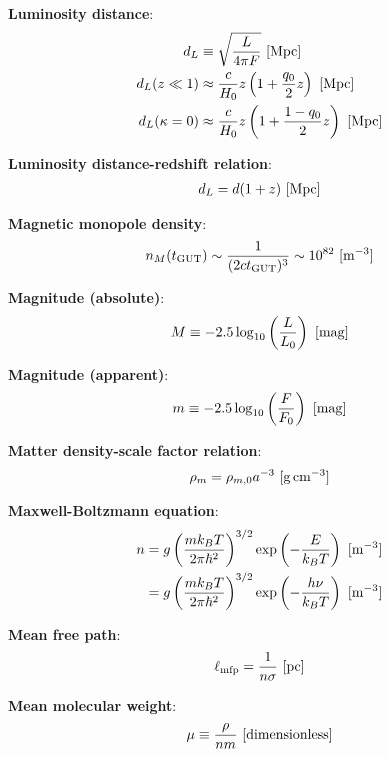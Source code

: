 \documentclass[a4paper,11pt]{article}
\begin{document}
{\noindent}\textbf{Luminosity distance}:
\begin{align*}
    d_L &\equiv \sqrt{\frac{L}{4\pi F}} ~ [{\rm Mpc}] \\
    d_L(z\ll1) &\approx \frac{c}{H_0}z\left(1+\frac{q_0}{2}z\right) ~ [{\rm Mpc}] \\
    d_L(\kappa=0) &\approx \frac{c}{H_0}z \left(1+\frac{1-q_0}{2}z\right) ~ [{\rm Mpc}]
\end{align*}

{\noindent}\textbf{Luminosity distance-redshift relation}:
\begin{align*}
    d_L = d(1+z) ~ [{\rm Mpc}]
\end{align*}

{\noindent}\textbf{Magnetic monopole density}:
\begin{align*}
    n_M(t_\mathrm{GUT}) \sim \frac{1}{(2ct_\mathrm{GUT})^3} \sim 10^{82} ~ [{\rm m^{-3}}]
\end{align*}

{\noindent}\textbf{Magnitude (absolute)}:
\begin{align*}
    M \equiv -2.5\log_{10}\left(\frac{L}{L_0}\right) ~ [{\rm mag}]
\end{align*}

{\noindent}\textbf{Magnitude (apparent)}:
\begin{align*}
    m \equiv -2.5\log_{10}\left(\frac{F}{F_0}\right) ~ [{\rm mag}]
\end{align*}

{\noindent}\textbf{Matter density-scale factor relation}:
\begin{align*}
    \rho_m = \rho_{m,0}a^{-3} ~ [{\rm g\,cm^{-3}}]
\end{align*}

{\noindent}\textbf{Maxwell-Boltzmann equation}:
\begin{align*}
    n &= g\left(\frac{mk_BT}{2\pi\hbar^2}\right)^{3/2}\exp\left(-\frac{E}{k_BT}\right) ~ [{\rm m^{-3}}] \\
    &= g\left(\frac{mk_BT}{2\pi\hbar^2}\right)^{3/2}\exp\left(-\frac{h\nu}{k_BT}\right) ~ [{\rm m^{-3}}]
\end{align*}

{\noindent}\textbf{Mean free path}:
\begin{align*}
    \ell_\mathrm{mfp} = \dfrac{1}{n\sigma} ~ [{\rm pc}]
\end{align*}

{\noindent}\textbf{Mean molecular weight}:
\begin{align*}
    \mu \equiv \frac{\rho}{nm} ~ [{\rm dimensionless}]
\end{align*}
\end{document}
